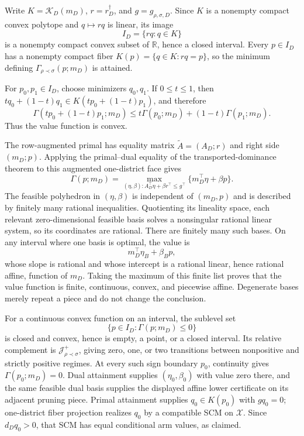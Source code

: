 Write \(K=\mathcal K_D(m_D)\), \(r=r_D^\dagger\), and \(g=g_{\rho,\sigma,D}\).  Since \(K\) is a nonempty compact convex polytope and \(q\mapsto rq\) is linear, its image
\[
 I_D=\{rq:q\in K\}
\]
is a nonempty compact convex subset of \(\mathbb R\), hence a closed interval.  Every \(p\in I_D\) has a nonempty compact fiber \(K(p)=\{q\in K:rq=p\}\), so the minimum defining \(\Gamma_{\rho\prec\sigma}(p;m_D)\) is attained.

For \(p_0,p_1\in I_D\), choose minimizers \(q_0,q_1\).  If \(0\leq t\leq1\), then \(tq_0+(1-t)q_1\in K(tp_0+(1-t)p_1)\), and therefore
\[
 \Gamma(tp_0+(1-t)p_1;m_D)
 \leq t\Gamma(p_0;m_D)+(1-t)\Gamma(p_1;m_D).
\]
Thus the value function is convex.

The row-augmented primal has equality matrix \(\widetilde A=(A_D;r)\) and right side \((m_D;p)\).  Applying the primal--dual equality of the transported-dominance theorem to this augmented one-district face gives
\[
 \Gamma(p;m_D)
 =\max_{(\eta,\beta):A_D^\top\eta+\beta r^\top\leq g^\top}
 \{m_D^\top\eta+\beta p\}.
\]
The feasible polyhedron in \((\eta,\beta)\) is independent of \((m_D,p)\) and is described by finitely many rational inequalities.  Quotienting its lineality space, each relevant zero-dimensional feasible basis solves a nonsingular rational linear system, so its coordinates are rational.  There are finitely many such bases.  On any interval where one basis is optimal, the value is
\[
 m_D^\top\eta_B+\beta_Bp,
\]
whose slope is rational and whose intercept is a rational linear, hence rational affine, function of \(m_D\).  Taking the maximum of this finite list proves that the value function is finite, continuous, convex, and piecewise affine.  Degenerate bases merely repeat a piece and do not change the conclusion.

For a continuous convex function on an interval, the sublevel set
\[
 \{p\in I_D:\Gamma(p;m_D)\leq0\}
\]
is closed and convex, hence is empty, a point, or a closed interval.  Its relative complement is \(\mathcal J_{\rho\prec\sigma}^+\), giving zero, one, or two transitions between nonpositive and strictly positive regimes.  At every such sign boundary \(p_0\), continuity gives \(\Gamma(p_0;m_D)=0\).  Dual attainment supplies \((\eta_0,\beta_0)\) with value zero there, and the same feasible dual basis supplies the displayed affine lower certificate on its adjacent pruning piece.  Primal attainment supplies \(q_0\in K(p_0)\) with \(gq_0=0\); one-district fiber projection realizes \(q_0\) by a compatible SCM on \(\mathcal X\).  Since \(d_Dq_0>0\), that SCM has equal conditional arm values, as claimed.